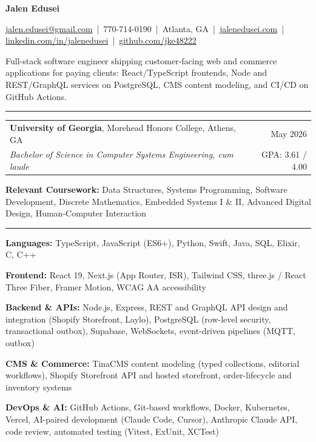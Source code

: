 \documentclass[letterpaper,10pt]{article}
\newcommand{\sectiontitle}[1]{\vspace{4pt}{\textbf{\large #1}}\par\vspace{-6pt}\rule{\textwidth}{0.4pt}\par\vspace{1pt}}
\begin{document}
\begin{center}
{\LARGE \textbf{Jalen Edusei}}\par
\vspace{2pt}
{\small \href{mailto:jalen.edusei@gmail.com}{jalen.edusei@gmail.com} \,|\,
770-714-0190 \,|\,
Atlanta, GA \,|\,
\href{https://www.jalenedusei.com}{jalenedusei.com} \,|\,
\href{https://www.linkedin.com/in/jalenedusei}{linkedin.com/in/jalenedusei} \,|\,
\href{https://github.com/jke48222}{github.com/jke48222}}
\end{center}

\vspace{3pt}
{\small Full-stack software engineer shipping customer-facing web and commerce applications for paying clients: React/TypeScript frontends, Node and REST/GraphQL services on PostgreSQL, CMS content modeling, and CI/CD on GitHub Actions.}\par

\sectiontitle{EDUCATION}
\begin{tabularx}{\textwidth}{@{}X r@{}}
\textbf{University of Georgia}, Morehead Honors College, Athens, GA & May 2026 \\
\textit{Bachelor of Science in Computer Systems Engineering, cum laude} & GPA: 3.61 / 4.00 \\
\end{tabularx}
\vspace{1pt}\par
{\small \textbf{Relevant Coursework:} Data Structures, Systems Programming, Software Development, Discrete Mathematics, Embedded Systems I \& II, Advanced Digital Design, Human-Computer Interaction}

\sectiontitle{TECHNICAL SKILLS}
\textbf{Languages:} TypeScript, JavaScript (ES6+), Python, Swift, Java, SQL, Elixir, C, C++\par
\textbf{Frontend:} React 19, Next.js (App Router, ISR), Tailwind CSS, three.js / React Three Fiber, Framer Motion, WCAG AA accessibility\par
\textbf{Backend \& APIs:} Node.js, Express, REST and GraphQL API design and integration (Shopify Storefront, Laylo), PostgreSQL (row-level security, transactional outbox), Supabase, WebSockets, event-driven pipelines (MQTT, outbox)\par
\textbf{CMS \& Commerce:} TinaCMS content modeling (typed collections, editorial workflows), Shopify Storefront API and hosted storefront, order-lifecycle and inventory systems\par
\textbf{DevOps \& AI:} GitHub Actions, Git-based workflows, Docker, Kubernetes, Vercel, AI-paired development (Claude Code, Cursor), Anthropic Claude API, code review, automated testing (Vitest, ExUnit, XCTest)
\end{document}
